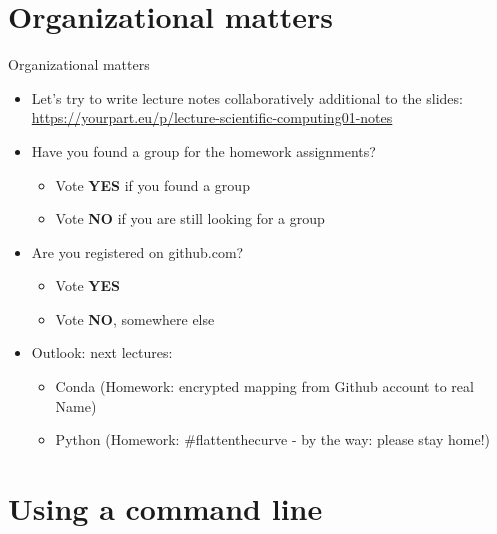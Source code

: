 
\subtitle{Command line, GIT and version control}
\date{2020-03-19}


\begin{frame}

	\tableofcontents

\end{frame}

\section{Organizational matters}
\begin{frame}[fragile]{Organizational matters}
    \begin{itemize}
        \item Let's try to write lecture notes collaboratively additional to the slides:
            \href{https://yourpart.eu/p/lecture-scientific-computing01-notes}{https://yourpart.eu/p/lecture-scientific-computing01-notes}\pause
        \item Have you found a group for the homework assignments?
        \begin{itemize}
            \item Vote {\bf YES} if you found a group
            \item Vote {\bf NO} if you are still looking for a group
        \end{itemize}\pause
        \item Are you registered on github.com?
        \begin{itemize}
            \item Vote {\bf YES}
            \item Vote {\bf NO}, somewhere else
        \end{itemize}\pause
        \item Outlook: next lectures:
            \begin{itemize}
                \item Conda (Homework: encrypted mapping from Github account to real Name)
                \item Python (Homework: \#flattenthecurve - by the way: please stay home!)
            \end{itemize}
    \end{itemize}
\end{frame}


\section{Using a command line}

